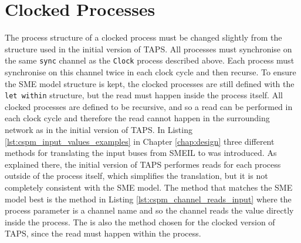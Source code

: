 \section{Clocked Processes}
The process structure of a clocked process must be changed slightly from the structure used in the initial version of TAPS. All processes must synchronise on the same \texttt{sync} channel as the \texttt{Clock} process described above. Each process must synchronise on this channel twice in each clock cycle and then recurse. To ensure the SME model structure is kept, the clocked processes are still defined with the \texttt{let within} structure, but the read must happen inside the process itself. All clocked processes are defined to be recursive, and so a read can be performed in each clock cycle and therefore the read cannot happen in the surrounding network as in the initial version of TAPS.
In Listing \ref{lst:cspm_input_values_examples} in Chapter \ref{chap:design} three different methods for translating the input buses from SMEIL to \cspm{} was introduced. As explained there, the initial version of TAPS performes reads for each process outside of the process itself, which simplifies the translation, but it is not completely consistent with the SME model. The method that matches the SME model best is the method in Listing \ref{lst:cspm_channel_reads_input} where the process parameter is a channel name and so the channel reads the value directly inside the process. The is also the method chosen for the clocked version of TAPS, since the read must happen within the process. \\

